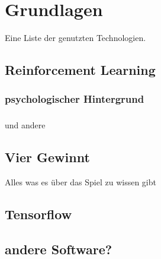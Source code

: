 \chapter{Grundlagen}%

\label{cha:Schluss}

Eine Liste der genutzten Technologien.

\section{Reinforcement Learning}
\subsection{psychologischer Hintergrund}

\subsection{}

\subsection{}
und andere
\section{Vier Gewinnt}
Alles was es über das Spiel zu wissen gibt

\section{Tensorflow}
\section{andere Software?}